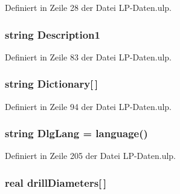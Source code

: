 Definiert in Zeile 28 der Datei L\+P-\/\+Daten.\+ulp.

\hypertarget{_l_p-_daten_8ulp_a1c49af292eb3eacb5f8614583d761bf7}{}
\subsubsection[{Description1}]{\setlength{\rightskip}{0pt plus 5cm}string Description1}\label{_l_p-_daten_8ulp_a1c49af292eb3eacb5f8614583d761bf7}


Definiert in Zeile 83 der Datei L\+P-\/\+Daten.\+ulp.

\hypertarget{_l_p-_daten_8ulp_a82291247e79bbab858c4aa4dd4495d6b}{}
\subsubsection[{Dictionary}]{\setlength{\rightskip}{0pt plus 5cm}string Dictionary\mbox{[}$\,$\mbox{]}}\label{_l_p-_daten_8ulp_a82291247e79bbab858c4aa4dd4495d6b}


Definiert in Zeile 94 der Datei L\+P-\/\+Daten.\+ulp.

\hypertarget{_l_p-_daten_8ulp_a808b87f9418f3acfded801090fcadf74}{}
\subsubsection[{Dlg\+Lang}]{\setlength{\rightskip}{0pt plus 5cm}string Dlg\+Lang = language()}\label{_l_p-_daten_8ulp_a808b87f9418f3acfded801090fcadf74}


Definiert in Zeile 205 der Datei L\+P-\/\+Daten.\+ulp.

\hypertarget{_l_p-_daten_8ulp_a24c382e25732f4291864d6a09a2ee2e8}{}
\subsubsection[{drill\+Diameters}]{\setlength{\rightskip}{0pt plus 5cm}real drill\+Diameters\mbox{[}$\,$\mbox{]}}\label{_l_p-_daten_8ulp_a24c382e25732f4291864d6a09a2ee2e8}


